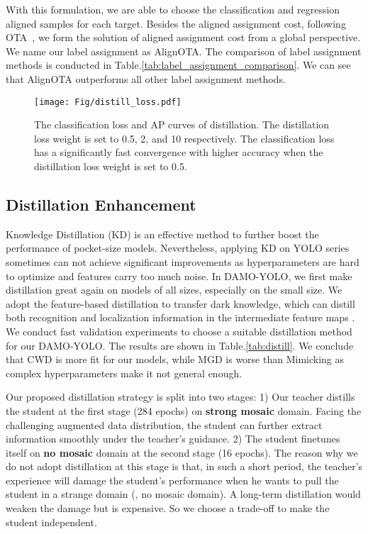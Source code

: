 \documentclass[10pt,twocolumn,letterpaper]{article}
\begin{document}
With this formulation, we are able to choose the classification and regression aligned samples for each target. Besides the aligned assignment cost, following OTA~\cite{ge2021ota}, we form the solution of aligned assignment cost from a global perspective.
We name our label assignment as AlignOTA. 
The comparison of label assignment methods is conducted in Table.\ref{tab:label_assignment_comparison}. We can see that AlignOTA outperforms all other label assignment methods. 
\begin{figure}[t]
    \centering
    \texttt{[image: Fig/distill\_loss.pdf]}
\caption{The classification loss and AP curves of distillation. The distillation loss weight is set to 0.5, 2, and 10 respectively. The classification loss has a significantly fast convergence with higher accuracy when the distillation loss weight is set to 0.5.}
    \label{fig:distill}
\end{figure}
\subsection{Distillation Enhancement}
Knowledge Distillation (KD) \cite{hinton2015distilling} is an effective method to further boost the performance of pocket-size models. Nevertheless, applying KD on YOLO series sometimes can not achieve significant improvements as hyperparameters are hard to optimize and features carry too much noise. In DAMO-YOLO, we first make distillation great again on models of all sizes, especially on the small size.
We adopt the feature-based distillation to transfer dark knowledge, which can distill both recognition and localization information in the intermediate feature maps \cite{huang2022masked}. We conduct fast validation experiments to choose a suitable distillation method for our DAMO-YOLO. The results are shown in Table.\ref{tab:distill}. We conclude that CWD is more fit for our models, while MGD is worse than Mimicking as complex hyperparameters make it not general enough.

Our proposed distillation strategy is split into two stages: 1) Our teacher distills the student at the first stage (284 epochs) on \textbf{strong mosaic} domain. Facing the challenging augmented data distribution, the student can further extract information smoothly under the teacher's guidance. 2) The student finetunes itself on \textbf{no mosaic} domain at the second stage (16 epochs). The reason why we do not adopt distillation at this stage is that, in such a short period, the teacher's experience will damage the student's performance when he wants to pull the student in a strange domain (\ie, no mosaic domain). A long-term distillation would weaken the damage but is expensive. So we choose a trade-off to make the student independent.
\end{document}
